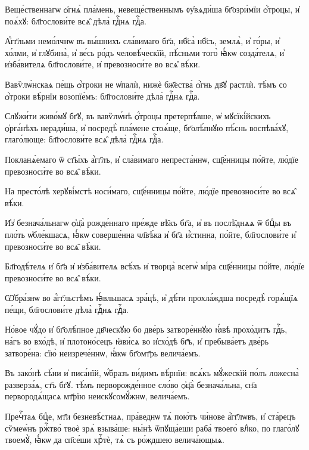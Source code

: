 \hKv Веще́ственнагѡ ѻ҆гнѧ̀ пла́мень, невеще́ственнымъ  ᲂу҆вѧди́ша бг҃озри́мїи ѻ҆́троцы, и҆ поѧ́хꙋ: бл҃гослови́те  всѧ̑ дѣла̀ гдⷭ҇нѧ гдⷭ҇а. 
%

\hKv А҆́гг҃льми немо́лчнѡ въ вы́шнихъ сла́вимаго бг҃а, нб҃са̀  нб҃съ, землѧ̀, и҆ го́ры, и҆ хо́лми, и҆ глꙋбина̀, и҆ ве́сь  ро́дъ человѣ́ческїй, пѣ́сньми того̀ ꙗ҆́кѡ созда́телѧ, и҆  и҆зба́вителѧ бл҃гослови́те, и҆ превозноси́те во всѧ̑ вѣ́ки. 

\hKv Вавѷлѡ́нскаѧ пе́щь ѻ҆́троки не ѡ҆палѝ, нижѐ бж҃ества̀  ѻ҆́гнь дв҃ꙋ растлѝ. тѣ́мъ со   ѻ҆́троки вѣ́рнїи возопїе́мъ: бл҃гослови́те дѣла̀ гдⷭ҇нѧ  гдⷭ҇а. 

\hKv Слꙋжи́ти живо́мꙋ бг҃ꙋ, въ вавѷлѡ́нѣ ѻ҆́троцы  претерпѣ́вше, ѡ҆ мꙋсїкі́йскихъ ѻ҆рга́нѣхъ неради́ша, и҆  посредѣ̀ пла́мене стоѧ́ще, бг҃олѣ́пнꙋю пѣ́снь  воспѣва́хꙋ, глаго́люще: бл҃гослови́те всѧ̑ дѣла̀ гдⷭ҇нѧ  гдⷭ҇а. 

\hKv Покланѧ́емаго ѿ ст҃ы́хъ а҆́гг҃лъ, и҆ сла́вимаго  непреста́ннѡ, сщ҃е́нницы по́йте, лю́дїе превозноси́те во  всѧ̑ вѣ́ки. 

\hKv На престо́лѣ херꙋві́мстѣ носи́маго, сщ҃е́нницы по́йте,  лю́дїе превозноси́те во всѧ̑ вѣ́ки. 

\hKv И҆з̾ безнача́льнагѡ ѻ҆ц҃а̀ рожде́ннаго пре́жде вѣ̑къ  бг҃а, и҆ въ послѣ̑днѧѧ ѿ бцⷣы въ пло́ть ѡ҆бле́кшасѧ,  ꙗ҆́кѡ соверше́нна чл҃вѣ́ка и҆ бг҃а и҆́стинна, по́йте,  бл҃гослови́те и҆ превозноси́те во всѧ̑ вѣ́ки. 

\hKv Бл҃годѣ́телѧ и҆ бг҃а и҆ и҆зба́вителѧ всѣ́хъ и҆ творца̀  всегѡ̀ мі́ра сщ҃е́нницы по́йте, лю́дїе превозноси́те во всѧ̑  вѣ́ки.  

\hKv Ѡ҆бра́знѡ во а҆́гг҃льстѣмъ ꙗ҆́вльшасѧ зра́цѣ, и҆ дѣ́ти  прохла́ждша посредѣ̀ горѧ́щїѧ пе́щи, бл҃гослови́те дѣла̀  гдⷭ҇нѧ гдⷭ҇а. 
%

\hKv Но́вое чꙋ́до и҆ бг҃олѣ́пное дв҃ческꙋю бо две́рь  затворе́ннꙋю ꙗ҆́вѣ прохо́дитъ гдⷭ҇ь, на́гъ во вхо́дѣ, и҆  плотоно́сецъ ꙗ҆ви́сѧ во и҆схо́дѣ бг҃ъ, и҆ пребыва́етъ  две́рь затворе́на: сїю̀ неизрече́ннѡ, ꙗ҆́кѡ бг҃омт҃рь  велича́емъ. 
%

\hKv Въ зако́нѣ сѣ́ни и҆ писа́нїй, ѡ҆́бразъ  ви́димъ вѣ́рнїи: всѧ́къ мꙋ́жескїй по́лъ ложесна̀  разверза́ѧ, ст҃ъ бг҃ꙋ. тѣ́мъ перворожде́нное сло́во ѻ҆ц҃а̀  безнача́льна, сн҃а первородѧ́щасѧ мт҃рїю неискꙋсомꙋ́жнѡ,  велича́емъ.  

\hKv Пречⷭ҇таѧ бцⷣе, мт҃и безневѣ́стнаѧ, пра́веднѡ тѧ̀ пою́тъ  чи́нове а҆́гг҃лѡвъ, и҆ ста́рецъ сѷмеѡ́нъ ржⷭ҇тво̀ твоѐ  зрѧ̀ взыва́ше: ны́нѣ ѿпꙋща́еши раба̀ твоего̀ влⷣко, по  глаго́лꙋ  твоемꙋ̀, ꙗ҆́кѡ да  сп҃се́ши хрⷭ҇тѐ, тѧ̀ съ ро́ждшею велича́ющыѧ. 

